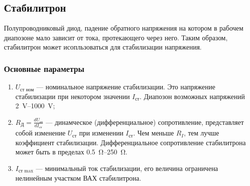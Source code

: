 \subsection{Стабилитрон}

\begin{definition}[Стабилитрон]
	Полупроводниковый диод, падение обратного напряжения на котором в рабочем
	диапозоне мало зависит от тока, протекающего через него. Таким образом,
	стабилитрон может исопльзоваться для стабилизации напряжения.
\end{definition}

\subsubsection{Основные параметры}

\begin{enumerate}
	\item $U_\text{ст ном}$ --- номинальное напряжение стабилизации. Это
	      напряжение стабилизации при некотором значении $I_\text{ст}$. Диапозон
	      возможных напряжений \qtyrange{2}{1000}{\volt};
	\item $R_\text{Д} = \frac{d U_\text{ст}}{d I_\text{ст}}$ --- динамческое
	      (дифференциальное) сопротивление, представляет собой изменение $U_\text{ст}$
	      при изменении $I_\text{ст}$. Чем меньше $R_I$, тем лучше коэффициент
	      стабилизации. Дифференциальное сопротивление стабилитрона может быть в
	      пределах \qtyrange{0.5}{250}{\ohm}.
	\item $I_{\text{ст } \max}$ --- минимальный ток стабилизации, его величина
	      ограничена нелинейным участком ВАХ стабилитрона.
\end{enumerate}
